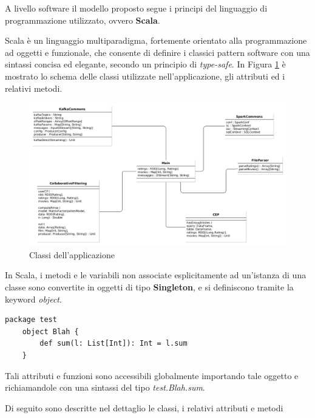 \documentclass[12pt]{article}
\begin{document}
A livello software il modello proposto segue i principi del linguaggio di programmazione utilizzato, ovvero \textbf{Scala}. 

Scala è un linguaggio multiparadigma, fortemente orientato alla programmazione ad oggetti e funzionale, che consente di definire i classici pattern software con una sintassi concisa ed elegante, secondo un principio di \textit{type-safe}. In Figura \ref{umlcep} è mostrato lo schema delle classi utilizzate nell'applicazione, gli attributi ed i relativi metodi. 

\begin{figure}[H]
	\centering
	\includegraphics[scale=0.40]{images/umlcep.png}
	\caption{Classi dell'applicazione}
	\label{umlcep}
\end{figure}

In Scala, i metodi e le variabili non associate esplicitamente ad un'istanza di una classe sono convertite in oggetti di tipo \textbf{Singleton}, e si definiscono tramite la keyword \textit{object}.

\begin{lstlisting}[style=scalacode, caption=Pattern Singleton in Scala]
	package test
	object Blah {
		def sum(l: List[Int]): Int = l.sum
	}
\end{lstlisting}

Tali attributi e funzioni sono accessibili globalmente importando tale oggetto e richiamandole con una sintassi del tipo \textit{test.Blah.sum}.

Di seguito sono descritte nel dettaglio le classi, i relativi attributi e metodi
\end{document}
